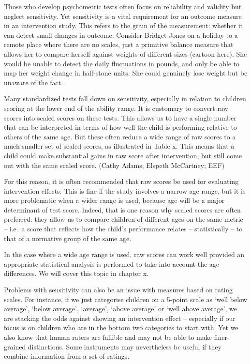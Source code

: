 \documentclass[]{book}
\begin{document}
Those who develop psychometric tests often focus on reliability and validity but neglect sensitivity. Yet sensitivity is a vital requirement for an outcome measure in an intervention study. This refers to the grain of the measurement: whether it can detect small changes in outcome. Consider Bridget Jones on a holiday to a remote place where there are no scales, just a primitive balance measure that allows her to compare herself against weights of different sizes (cartoon here). She would be unable to detect the daily fluctuations in pounds, and only be able to map her weight change in half-stone units. She could genuinely lose weight but be unaware of the fact.

Many standardized tests fall down on sensitivity, especially in relation to children scoring at the lower end of the ability range. It is customary to convert raw scores into scaled scores on these tests. This allows us to have a single number that can be interpreted in terms of how well the child is performing relative to others of the same age. But these often reduce a wide range of raw scores to a much smaller set of scaled scores, as illustrated in Table x. This means that a child could make substantial gains in raw score after intervention, but still come out with the same scaled score.
(Cathy Adams; Elspeth McCartney; EEF)

For this reason, it is often recommended that raw scores be used for evaluating intervention effects. This is fine if the study involves a narrow age range, but it is more problematic when a wider range is used, because age will be a major determinant of test score. Indeed, that is one reason why scaled scores are often preferred: they allow us to compare children of different ages on the same metric -- i.e.~a score that reflects how the child's performance relates -- statistically -- to that of a normative group of the same age.

In the case where a wide age range is used, raw scores can work well provided an appropriate statistical analysis is performed to take into account the age differences. We will cover this topic in chapter x.

Problems with sensitivity can also be an issue with measures based on rating scales. For instance, if we just categorise children on a 5-point scale as `well below average', `below average', `average', `above average' or `well above average', we are stacking the odds against showing an intervention effect -- especially if our focus is on children who are in the bottom two categories to start with. Yet we also know that human raters are fallible and may not be able to make finer-grained distinctions. Some instruments may nevertheless be useful if they combine information from a set of ratings.
\end{document}
